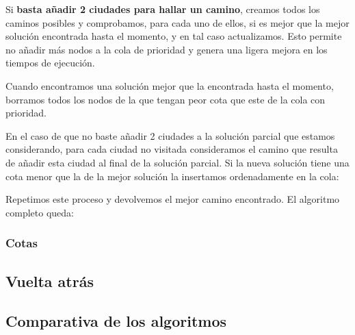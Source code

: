Si \textbf{basta añadir 2 ciudades para hallar un camino}, creamos todos los caminos posibles y comprobamos, para cada uno de ellos, si es mejor que la mejor solución encontrada hasta el momento, y en tal caso actualizamos. Esto permite no añadir más nodos a la cola de prioridad y genera una ligera mejora en los tiempos de ejecución.


Cuando encontramos una solución mejor que la encontrada hasta el momento, borramos todos los nodos de la que tengan peor cota que este de la cola con prioridad.

En el caso de que no baste añadir 2 ciudades a la solución parcial que estamos considerando, para cada ciudad no visitada consideramos el camino que resulta de añadir esta ciudad al final de la solución parcial. Si la nueva solución tiene una cota menor que la de la mejor solución la insertamos ordenadamente en la cola:


Repetimos este proceso y devolvemos el mejor camino encontrado. El algoritmo completo queda:


\subsubsection{Cotas}


\subsection{Vuelta atrás}


\subsection{Comparativa de los algoritmos}

